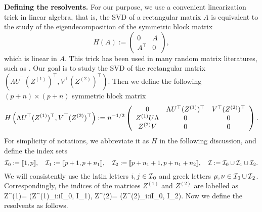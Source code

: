 \medskip
\noindent\textbf{Defining the resolvents.} For our purpose, we use a convenient linearization trick in linear algebra, that is, the SVD of a rectangular matrix $A$ is equivalent to the study of the eigendecomposition of the symmetric block matrix
$$H(A):=\begin{pmatrix}0 & A \\ A^\top & 0\end{pmatrix},$$
which is linear in $A$. This trick has been used in many random matrix literatures, such as \cite{Anisotropic, AEK_Gram, XYY_circular,DY20201}. Our goal is to study the SVD of the rectangular matrix $(\Lambda U^\top (Z^{(1)})^\top,V^\top (Z^{(2)})^\top)$. %
Then we define the following $(p+n)\times (p+n)$ symmetric block matrix
 \begin{equation}\label{linearize_block}
    H\left(\Lambda U^\top (Z^{(1)})^\top,V^\top (Z^{(2)})^\top\right): = n^{-1/2}\left( {\begin{array}{*{20}c}
   { 0 } & \Lambda U^{\top}(Z^{(1)})^\top & V^\top (Z^{(2)})^\top  \\
   {Z^{(1)} U\Lambda  } & {0} & 0 \\
   {Z^{(2)}V} & 0 & 0
   \end{array}} \right).
 \end{equation}
For simplicity of notations, we abbreviate it as $H$ in the following discussion, and define the index sets
$$\cal I_0:=\llbracket 1,p\rrbracket, \quad  \cal I_1:=\llbracket p+1,p+n_1\rrbracket, \quad \cal I_2:=\llbracket p+n_1+1,p+n_1+n_2\rrbracket ,\quad \cal I:=\cal I_0\cup \cal I_1\cup \cal I_2  .$$
 We will consistently use the latin letters $i,j\in\sI_{0}$ and greek letters $\mu,\nu\in\sI_{1}\cup \sI_{2}$. Correspondingly, the indices of the matrices $Z^{(1)}$ and $Z^{(2)}$ are labelled as
 \be\label{labelZ}
 Z^{(1)}= (Z^{(1)}_{\mu i}:i\in \mathcal I_0, \mu \in \mathcal I_1), \quad Z^{(2)}= (Z^{(2)}_{\nu i}:i\in \mathcal I_0, \nu \in \mathcal I_2).\ee
Now we define the resolvents as follows.
